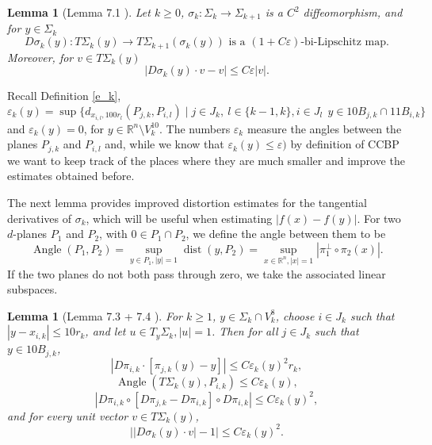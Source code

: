 \documentclass[11pt, twoside, leqno]{article}
\numberwithin{equation}{section}
\theoremstyle{plain}
\newtheorem{lem}[thm]{Lemma}
\theoremstyle{definition}
\newcommand{\R}{\mathbb{R}}
\newcommand{\e}{\varepsilon} %
\newcommand{\dist}{\operatorname{dist}}
\begin{document}
\begin{lem} [Lemma 7.1 \cite{davidtoro}] \label{tgderivatives}
Let $k \geq 0$, $\sigma_k \colon \Sigma_k \to \Sigma_{k+1}$ is a $C^2$ diffeomorphism, and for $y \in \Sigma_k$
\begin{equation}
D\sigma_k(y) \colon T \Sigma_k(y) \to T\Sigma_{k+1}(\sigma_k(y)) \text{ is a $(1+C\e)$-bi-Lipschitz map}.
\end{equation}
Moreover, for $v \in T\Sigma_k(y)$
\begin{equation} \label{inverse2}
\left| D\sigma_k(y)\cdot v - v \right| \leq  C \e|v|.
\end{equation}
\end{lem}

Recall Definition \ref{e_k}, 
\begin{equation}
 \e_k(y)=\sup\{ d_{x_{i,l},100r_l}(P_{j,k},P_{i,l}) \mid j \in J_k, \ l \in \{k-1,k\}, i \in J_l \  \ y \in 10B_{j,k} \cap11B_{i,k}\}
\end{equation}
and $ \e_k(y)=0$, for $y \in \R^n \setminus V_k^{10}$.
The numbers $\e_k$ measure the angles between the planes $P_{j,k}$ and $P_{i,l}$ and, while we know that $\e_k(y)\leq \e)$ by definition of CCBP we want to keep track of the places where they are much smaller and improve the estimates obtained before. 

The next lemma provides improved distortion estimates for the tangential derivatives of $\sigma_k$, which will be useful when estimating $|f(x)-f(y)|$.
For two $d$-planes $P_1$ and $P_2$, with $0 \in P_1 \cap P_2$, we define the angle between them to be 
\begin{equation}
\operatorname{Angle}(P_1,P_2)=\sup_{y \in P_1, |y|=1}\dist(y,P_2)=\sup_{x \in \R^n, |x|=1}|\pi_1^{\perp}\circ \pi_2(x)|.
\end{equation}
If the two planes do not both pass through zero, we take the associated linear subspaces.
\begin{lem} [Lemma 7.3 + 7.4 \cite{davidtoro}] \label{lem74}
For $k \geq 1$, $y \in \Sigma_k \cap V_k^8$, choose $i \in J_k$ such that $|y-x_{i,k}|\leq 10 r_k$, and let $u \in T_y\Sigma_k, |u|=1$. Then for all $j \in J_k$ such that $y \in 10B_{j,k}$, 
\begin{equation} \label{lemma73}
    \left| D\pi_{i,k} \cdot [\pi_{j,k}(y)-y] \right| \leq C\e_k(y)^2r_k,
\end{equation}
\begin{equation} \label{lemma73angle}
    \operatorname{Angle}(T\Sigma_k(y),P_{i,k}) \leq C\e_k(y),
\end{equation}
\begin{equation} \label{74proof}
    \left| D\pi_{i,k} \circ \left[D\pi_{j,k}- D\pi_{i,k}\right] \circ D\pi_{i,k} \right| \leq C \e_k(y)^2,
\end{equation}
and for every unit vector $v \in T\Sigma_k(y)$,
\begin{equation} \label{e2sigma}
    \left||D\sigma_k(y)\cdot v|-1\right| \leq  C \e_k(y)^2.
\end{equation}
\end{lem}
\end{document}
